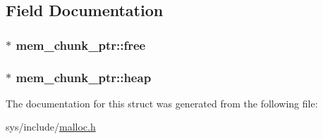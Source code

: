 \subsection{Field Documentation}
\hypertarget{structmem__chunk__ptr_af7a1f60b420bd7ef98dde5a4cbc5bdf3}{
\subsubsection[{free}]{$\ast$ mem\-\_\-chunk\-\_\-ptr\-::free}}\label{structmem__chunk__ptr_af7a1f60b420bd7ef98dde5a4cbc5bdf3}
\hypertarget{structmem__chunk__ptr_aaddfb089e921369846e272d2d2b56e84}{
\subsubsection[{heap}]{$\ast$ mem\-\_\-chunk\-\_\-ptr\-::heap}}\label{structmem__chunk__ptr_aaddfb089e921369846e272d2d2b56e84}


The documentation for this struct was generated from the following file\-:\begin{DoxyCompactItemize}
\item 
sys/include/\hyperlink{malloc_8h}{malloc.\-h}\end{DoxyCompactItemize}
